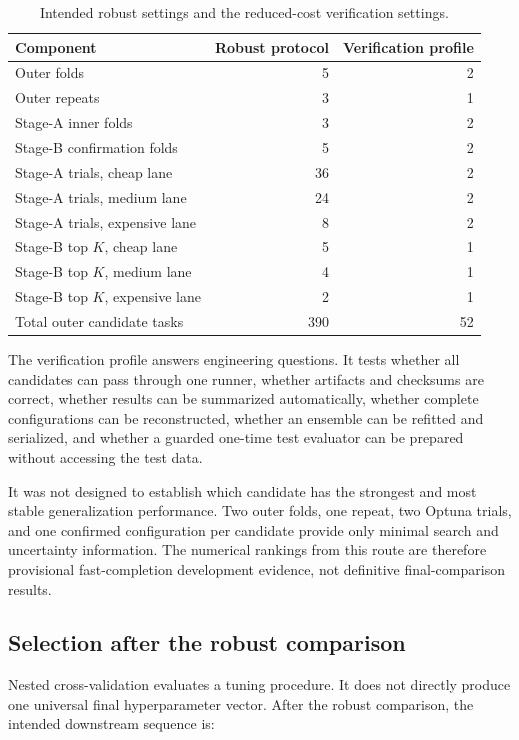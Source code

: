 \begin{table}[H]
\centering
\caption{Intended robust settings and the reduced-cost verification settings.}
\label{tab:robust-versus-fast-completion}
\begin{tabular}{p{5.6cm}rr}
\toprule
Component & Robust protocol & Verification profile \\
\midrule
Outer folds & 5 & 2 \\
Outer repeats & 3 & 1 \\
Stage-A inner folds & 3 & 2 \\
Stage-B confirmation folds & 5 & 2 \\
Stage-A trials, cheap lane & 36 & 2 \\
Stage-A trials, medium lane & 24 & 2 \\
Stage-A trials, expensive lane & 8 & 2 \\
Stage-B top $K$, cheap lane & 5 & 1 \\
Stage-B top $K$, medium lane & 4 & 1 \\
Stage-B top $K$, expensive lane & 2 & 1 \\
Total outer candidate tasks & 390 & 52 \\
\bottomrule
\end{tabular}
\end{table}

The verification profile answers engineering questions. It tests whether all candidates can pass through one runner, whether artifacts and checksums are correct, whether results can be summarized automatically, whether complete configurations can be reconstructed, whether an ensemble can be refitted and serialized, and whether a guarded one-time test evaluator can be prepared without accessing the test data.

It was not designed to establish which candidate has the strongest and most stable generalization performance. Two outer folds, one repeat, two Optuna trials, and one confirmed configuration per candidate provide only minimal search and uncertainty information. The numerical rankings from this route are therefore provisional fast-completion development evidence, not definitive final-comparison results.

\subsection{Selection after the robust comparison}

Nested cross-validation evaluates a tuning procedure. It does not directly produce one universal final hyperparameter vector. After the robust comparison, the intended downstream sequence is:

